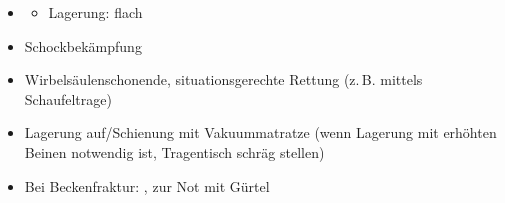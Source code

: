 {
\begin{itemize}
  \item \TxMassVitMKBes
  \begin{itemize}
    \item Lagerung: flach
  \end{itemize}
  \item Schockbekämpfung
  \item Wirbelsäulenschonende, situationsgerechte Rettung (z.\,B. mittels
  Schaufeltrage)
  \item Lagerung auf/Schienung mit Vakuummatratze (wenn
  Lagerung mit erhöhten Beinen notwendig ist,
  Tragentisch schräg stellen)
  \item Bei Beckenfraktur:
  , zur Not mit
  Gürtel
\end{itemize}
}

